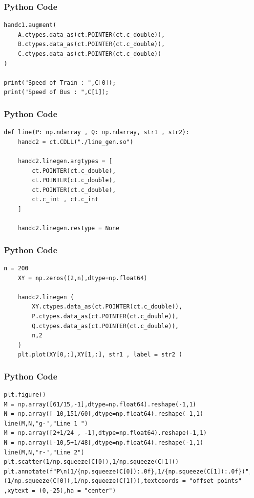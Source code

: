 \documentclass{beamer}
\begin{document}
\begin{frame}[fragile]
    \frametitle{Python Code}
    \begin{lstlisting}
handc1.augment(
    A.ctypes.data_as(ct.POINTER(ct.c_double)),
    B.ctypes.data_as(ct.POINTER(ct.c_double)),
    C.ctypes.data_as(ct.POINTER(ct.c_double))
)

print("Speed of Train : ",C[0]);
print("Speed of Bus : ",C[1]);

\end{lstlisting}
\end{frame}

\begin{frame}[fragile]
    \frametitle{Python Code}
    \begin{lstlisting}
def line(P: np.ndarray , Q: np.ndarray, str1 , str2):
    handc2 = ct.CDLL("./line_gen.so")

    handc2.linegen.argtypes = [
        ct.POINTER(ct.c_double),
        ct.POINTER(ct.c_double),
        ct.POINTER(ct.c_double),
        ct.c_int , ct.c_int
    ]

    handc2.linegen.restype = None

\end{lstlisting}
\end{frame}
\begin{frame}[fragile]
    \frametitle{Python Code}
    \begin{lstlisting}
n = 200
    XY = np.zeros((2,n),dtype=np.float64)

    handc2.linegen (
        XY.ctypes.data_as(ct.POINTER(ct.c_double)),
        P.ctypes.data_as(ct.POINTER(ct.c_double)),
        Q.ctypes.data_as(ct.POINTER(ct.c_double)),
        n,2
    )
    plt.plot(XY[0,:],XY[1,:], str1 , label = str2 )

\end{lstlisting}
\end{frame}
\begin{frame}[fragile]
    \frametitle{Python Code}
    \begin{lstlisting}
plt.figure()
M = np.array([61/15,-1],dtype=np.float64).reshape(-1,1)
N = np.array([-10,151/60],dtype=np.float64).reshape(-1,1)
line(M,N,"g-","Line 1 ")
M = np.array([2+1/24 , -1],dtype=np.float64).reshape(-1,1)
N = np.array([-10,5+1/48],dtype=np.float64).reshape(-1,1)
line(M,N,"r-","Line 2")
plt.scatter(1/np.squeeze(C[0]),1/np.squeeze(C[1]))
plt.annotate(f"P\n(1/{np.squeeze(C[0]):.0f},1/{np.squeeze(C[1]):.0f})",(1/np.squeeze(C[0]),1/np.squeeze(C[1])),textcoords = "offset points" ,xytext = (0,-25),ha = "center")

\end{lstlisting}
\end{frame}
\end{document}
